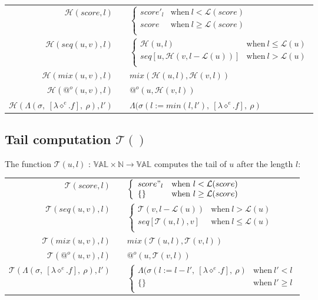 \documentclass[10pt,a4paper,frenchb]{article}
\makeatletter
\newcommand{\var}[1]	{\ensuremath{\diamond^#1}}
\newcommand{\es}		{\{\}}
\newcommand{\val}		{\ensuremath{\mathbb{VAL}}}
\newcommand{\closure}	{\ensuremath{\Lambda}}
\newcommand{\applyop}	{\ensuremath{@}}
\newcommand{\noredex}	{\ensuremath{\applyop^o}}
\newcommand{\sdomain}[3]{$#1 \times #2 \rightarrow #3$}
\newcommand{\envsym}			{\ensuremath{\rho}}
\newcommand{\closenv}[2][f]		{\closure(#2,\ [\lambda \var{e}.#1],\ \envsym)}
\newcommand{\apexpr}[1] 	{#1(u, v)}
\newcommand{\length}		{\ensuremath{\mathcal L}}
\newcommand{\head}			{\ensuremath{\mathcal H}}
\newcommand{\tail}			{\ensuremath{\mathcal T}}
\newcommand{\bounds}		{\ensuremath{\sigma}}
\newcommand{\evaltable}[1][$\rightarrow$]	  {\begin{center} \begin{tabular*}{0.9\linewidth}{rc@{ #1 }l}}
\newcommand{\evaltablend}  		{\end{tabular*}\end{center}}
\newcommand{\evalspace}	  		{\vspace{2mm}\\}
\makeatother
\begin{document}
\evaltable
 \hline
 $\head(score,l)$				& & $\left\{ \begin{array}{ll}
 								score'_{l} & \mathrm{when} \  l < \length(score) \\
								score & \mathrm{when} \  l \geq \length(score) \\
	 							\end{array} \right.$ \evalspace
 $\head(\apexpr{seq},l)$		& & $\left\{ \begin{array}{ll}
 								\head(u,l) & \mathrm{when} \  l \leq \length(u) \\
								seq[u, \head(v, l-\length(u))] & \mathrm{when} \  l > \length(u) \\
	 							\end{array} \right.$ \evalspace
 $\head(\apexpr{mix},l)$ 			& & $mix(\head(u, l), \head(v, l))$ \\
 $\head(\noredex (u,v),l)$ 	& & $\noredex(u,\head(v,l))$ \\
 $\head(\closenv{\bounds},l')$ 	& &  $\closenv{\bounds(l:=min(l,l')}$ \\
 \hline
\evaltablend

\subsection{Tail computation $\tail()$}
The function $\tail(u,l)$ :  \sdomain{\val}{\mathbb{N}}{\val} computes the tail of $u$ after the length $l$:

\evaltable
 \hline
 $\tail(score,l)$				& & $\left\{ \begin{array}{ll}
 								score"_{l} & \mathrm{when} \  l < \length(score) \\
								\es & \mathrm{when} \  l \geq \length(score) \\
	 							\end{array} \right.$ \evalspace
 $\tail(\apexpr{seq},l)$		& & $\left\{ \begin{array}{ll}
 								\tail(v,l-\length(u)) & \mathrm{when} \  l > \length(u) \\
								seq[\tail(u, l),v] & \mathrm{when} \  l \leq \length(u) \\
	 							\end{array} \right.$ \evalspace
 $\tail(\apexpr{mix},l)$ 			& & $mix(\tail(u, l), \tail(v, l))$ \\
 $\tail(\noredex (u,v),l)$ 	& & $\noredex(u, \tail(v,l))$ \\
 $\tail(\closenv{\bounds},l')$ 	& &  $\left\{ \begin{array}{ll}
 								\closenv{\bounds(l:=l-l'} & \mathrm{when} \  l' < l \\
								\es & \mathrm{when} \  l' \geq l \\
	 							\end{array} \right.$ \\
 \hline
\evaltablend
\end{document}
